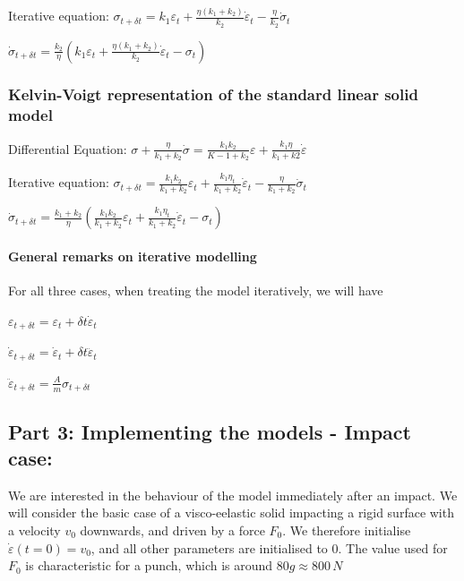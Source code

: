 \documentclass[11pt]{article}
\newcommand{\eps}{\varepsilon}
\begin{document}
Iterative equation:
$\sigma_{t+\delta t} = k_1\eps_t + \frac{\eta(k_1 + k_2)}{k_2}\dot{\eps}_t - \frac{\eta}{k_2}\dot{\sigma}_t$

$\dot{\sigma}_{t+\delta t} = \frac{k_2}{\eta}\left(k_1\eps_t + \frac{\eta(k_1 + k_2)}{k_2}\dot{\eps}_t - \sigma_t \right)$

\subsubsection{Kelvin-Voigt representation of the standard linear solid
model}\label{kelvin-voigt-representation-of-the-standard-linear-solid-model}

Differential Equation:
$\sigma + \frac{\eta}{k_1+k_2}\dot{\sigma} = \frac{k_1k_2}{K-1+k_2}\eps + \frac{k_1\eta}{k_1+k2}\dot{\eps}$

Iterative equation:
$\sigma_{t+\delta t} = \frac{k_1k_2}{k_1+k_2}\eps_t + \frac{k_1\eta_t}{k_1+k_2}\dot{\eps}_t - \frac{\eta}{k_1+k_2}\dot{\sigma}_t$

$\dot{\sigma}_{t+\delta t} = \frac{k_1+k_2}{\eta}\left(\frac{k_1k_2}{k_1+k_2}\eps_t + \frac{k_1\eta_t}{k_1+k_2}\dot{\eps}_t - \sigma_t \right)$

\paragraph{General remarks on iterative
modelling}\label{general-remarks-on-iterative-modelling}

For all three cases, when treating the model iteratively, we will have

$\eps_{t+\delta t} = \eps_t + \delta t \dot{\eps}_t$

$\dot{\eps}_{t+\delta t} = \dot{\eps}_{t} + \delta t \ddot{\eps}_t$

$\ddot{\eps}_{t+\delta t} = \frac{A}{m}\sigma_{t+\delta t}$

    \subsection{Part 3: Implementing the models - Impact
case:}\label{part-3-implementing-the-models---impact-case}

We are interested in the behaviour of the model immediately after an
impact. We will consider the basic case of a visco-eelastic solid
impacting a rigid surface with a velocity $v_0$ downwards, and driven
by a force $F_0$. We therefore initialise $\dot{\eps}(t=0) = v_0$,
and all other parameters are initialised to 0. The value used for
$F_0$ is characteristic for a punch, which is around
$80g \approx 800 \, N$
\end{document}
